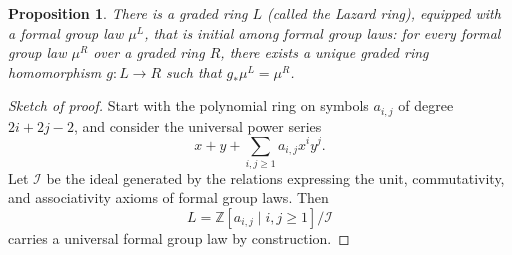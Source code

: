 \documentclass[a4paper]{amsart}
\theoremstyle{plain}
\newtheorem{proposition}[subsubsection]{Proposition}
\theoremstyle{definition}
\newcommand{\ZZ}{\mathbb{Z}}
\renewcommand{\ge}{\geqslant}
\begin{document}
\begin{proposition}
	There is a graded ring $L$ (called the Lazard ring), equipped with a formal group law $\mu^{L}$, that is initial among formal group laws: for every formal group law $\mu^{R}$ over a graded ring $R$, there exists a unique graded ring homomorphism $g:L\to R$ such that $g_{*}\mu^{L}=\mu^{R}$.
\end{proposition}
\begin{proof}[Sketch of proof]
	Start with the polynomial ring on symbols $a_{i,j}$ of degree $2i+2j-2$, and consider the universal power series
	\[
		x+y+\sum_{i,j\ge 1}a_{i,j}x^iy^j.
	\]
	Let $\mathcal{I}$ be the ideal generated by the relations expressing the unit, commutativity, and associativity axioms of formal group laws. Then
	\[
		L=\ZZ[a_{i,j}\mid i,j\ge 1]/\mathcal{I}
	\]
	carries a universal formal group law by construction.
\end{proof}
\end{document}
